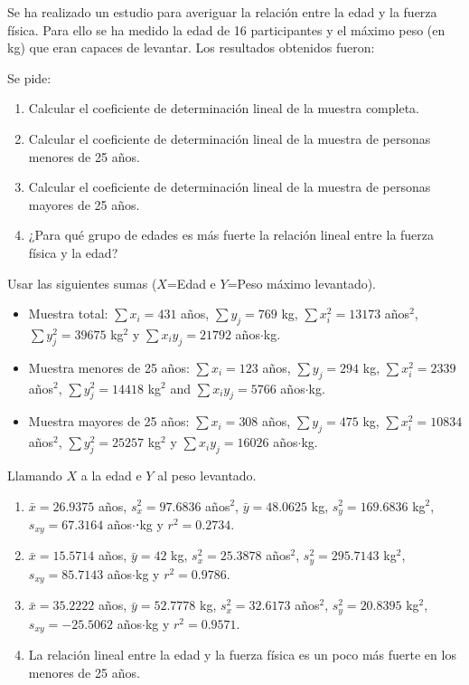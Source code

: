 {Se ha realizado un estudio para averiguar la relación entre la edad y la fuerza física. Para ello se ha medido la edad
de 16 participantes y el máximo peso (en kg) que eran capaces de levantar. Los resultados obtenidos fueron: 
\begin{center}
\resizebox{0.7\textwidth}{!}{}
\end{center}
Se pide: 
\begin{enumerate}
\item Calcular el coeficiente de determinación lineal de la muestra completa.
\item Calcular el coeficiente de determinación lineal de la muestra de personas menores de 25 años.
\item Calcular el coeficiente de determinación lineal de la muestra de personas mayores de 25 años.
\item ¿Para qué grupo de edades es más fuerte la relación lineal entre la fuerza física y la edad?
\end{enumerate}

Usar las siguientes sumas ($X$=Edad e $Y$=Peso máximo levantado).
\begin{itemize}[label=--]
\item Muestra total: $\sum x_i=431$ años, $\sum y_j=769$ kg, $\sum x_i^2=13173$ años$^2$, $\sum y_j^2=39675$
kg$^2$ y $\sum x_iy_j=21792$ años$\cdot$kg.
\item Muestra menores de 25 años: $\sum x_i=123$ años, $\sum y_j=294$ kg, $\sum x_i^2=2339$ años$^2$, $\sum y_j^2=14418$
kg$^2$ and $\sum x_iy_j=5766$ años$\cdot$kg.
\item Muestra mayores de 25 años: $\sum x_i=308$ años, $\sum y_j=475$ kg, $\sum x_i^2=10834$ años$^2$, $\sum y_j^2=25257$
kg$^2$ y $\sum x_iy_j=16026$ años$\cdot$kg.
\end{itemize}
}
{Llamando $X$ a la edad e $Y$ al peso levantado.
\begin{enumerate}
\item  $\bar x=26.9375$ años, $s_x^2=97.6836$ años$^2$, $\bar{y}=48.0625$ kg, $s_y^2=169.6836$ kg$^2$, $s_{xy}=67.3164$ años$\cdot$⋅kg y $r^2=0.2734$. 
\item $\bar x=15.5714$ años, $\bar y=42$ kg, $s_x^2=25.3878$ años$^2$, $s_y^2=295.7143$ kg$^2$, $s_{xy}=85.7143$ años$\cdot$kg y $r^2=0.9786$.
\item $\bar x=35.2222$ años, $\bar y=52.7778$ kg, $s_x^2=32.6173$ años$^2$, $s_y^2=20.8395$ kg$^2$,
$s_{xy}=-25.5062$ años$\cdot$kg y $r^2=0.9571$.
\item La relación lineal entre la edad y la fuerza física es un poco más fuerte en los menores de 25 años.
\end{enumerate}
}
{}


